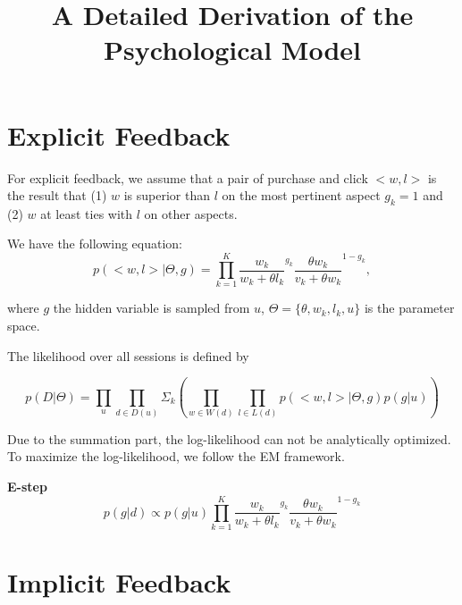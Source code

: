 \documentclass{article}
\title{A Detailed Derivation of the Psychological Model}
\begin{document}
\section{Explicit Feedback}
For explicit feedback, we assume that a pair of purchase and click $<w,l>$ is the result that (1) $w$ is superior than $l$ on the most pertinent aspect $g_k=1$ and (2) $w$ at least ties with $l$ on other aspects. 

We have the following equation: 
\begin{equation}
p(<w,l>|\Theta,g) = \prod_{k=1}^K {\frac{w_k}{w_k+\theta l_k}}^{g_k} {\frac{\theta w_k}{v_k + \theta w_k}}^{1-g_k},
\end{equation} 
 
where $g$ the hidden variable is sampled from $u$, $\Theta=\{\theta,w_k,l_k, u\}$ is the parameter space.

The likelihood over all sessions is defined by

\begin{equation}
p(D|\Theta)= \prod _u \prod_{d\in D(u)} \Sigma_k (\prod_{w\in W(d)} \prod_{l \in L(d)} p(<w,l>|\Theta,g) p(g|u))
\end{equation} 

Due to the summation part, the log-likelihood can not be analytically optimized. To maximize the log-likelihood, we follow the EM framework.

\textbf{E-step} 
\begin{equation}
p(g|d) \propto   p(g|u)  \prod_{k=1}^K {\frac{w_k}{w_k+\theta l_k}}^{g_k} {\frac{\theta w_k}{v_k + \theta w_k}}^{1-g_k}
\end{equation} 


\section{Implicit Feedback}
\end{document}
